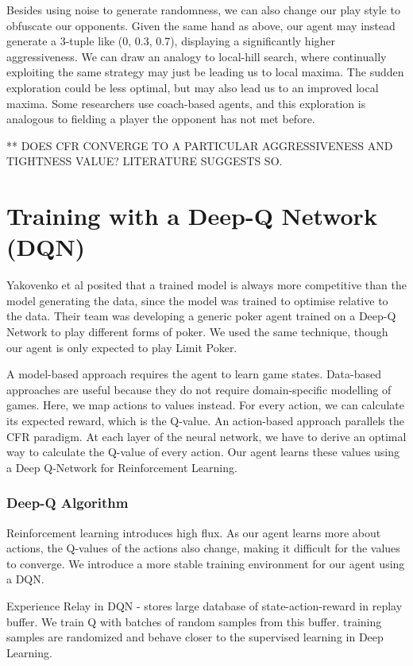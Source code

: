 \documentclass{article}
\begin{document}
Besides using noise to generate randomness, we can also change our play style to obfuscate our opponents. Given the same hand as above, our agent may instead generate a 3-tuple like (0, 0.3, 0.7), displaying a significantly higher aggressiveness. We can draw an analogy to local-hill search, where continually exploiting the same strategy may just be leading us to local maxima. The sudden exploration could be less optimal, but may also lead us to an improved local maxima. Some researchers use coach-based agents, and this exploration is analogous to fielding a player the opponent has not met before.

** DOES CFR CONVERGE TO A PARTICULAR AGGRESSIVENESS AND TIGHTNESS VALUE? LITERATURE SUGGESTS SO.

\section{Training with a Deep-Q Network (DQN)}

Yakovenko et al posited that a trained model is always more competitive than the model generating the data, since the model was trained to optimise relative to the data. Their team was developing a generic poker agent trained on a Deep-Q Network to play different forms of poker. We used the same technique, though our agent is only expected to play Limit Poker.

A model-based approach requires the agent to learn game states. Data-based approaches are useful because they do not require domain-specific modelling of games. Here, we map actions to values instead. For every action, we can calculate its expected reward, which is the Q-value. An action-based approach parallels the CFR paradigm. At each layer of the neural network, we have to derive an optimal way to calculate the Q-value of every action. Our agent learns these values using a Deep Q-Network for Reinforcement Learning.

\subsubsection{Deep-Q Algorithm}
Reinforcement learning introduces high flux. As our agent learns more about actions, the Q-values of the actions also change, making it difficult for the values to converge. We introduce a more stable training environment for our agent using a DQN.

Experience Relay in DQN - 
stores large database of state-action-reward in replay buffer. We train Q with batches of random samples from this buffer. training samples are randomized and behave closer to the supervised learning in Deep Learning.
\end{document}
